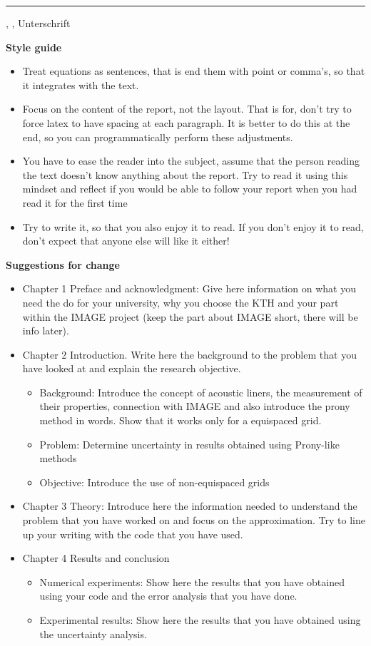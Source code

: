 \documentclass[11pt]{report} %
\begin{document}
\vspace{18.1mm}
\rule[-3.7mm]{\linewidth}{0.5pt}
\Ort{}, \Datum{}, Unterschrift


{\bf Style guide}
\begin{itemize}
\item Treat equations as sentences, that is end them with point or comma's, so that it integrates with the text.
\item Focus on the content of the report, not the layout. That is for, don't try to force latex to have spacing at each paragraph. It is better to do this at the end, so you can programmatically perform these adjustments.
\item You have to ease the reader into the subject, assume that the person reading the text doesn't know anything about the report. Try to read it using this mindset and reflect if you would be able to follow your report when you had read it for the first time
\item Try to write it, so that you also enjoy it to read. If you don't enjoy it to read, don't expect that anyone else will like it either!
\end{itemize}
{\bf Suggestions for change}
\begin{itemize}
    \item Chapter 1 Preface and acknowledgment: Give here information on what you need the do for your university, why you choose the KTH and your part within the IMAGE project (keep the part about IMAGE short, there will be info later).
    \item Chapter 2 Introduction. Write here the background to the problem that you have looked at and explain the research objective.
        \begin{itemize}
            \item Background: Introduce the concept of acoustic liners, the measurement of their properties, connection with IMAGE and also introduce the prony method in words. Show that it works only for a equispaced grid. 
            \item Problem: Determine uncertainty in results obtained using Prony-like methods
            \item Objective: Introduce the use of non-equispaced grids
        \end{itemize}
    \item Chapter 3 Theory: Introduce here the information needed to understand the problem that you have worked on and focus on the approximation. Try to line up your writing with the code that you have used.
    \item Chapter 4 Results and conclusion
        \begin{itemize}
            \item Numerical experiments: Show here the results that you have obtained using your code and the error analysis that you have done.
            \item Experimental results: Show here the results that you have obtained using the uncertainty analysis.
        \end{itemize}
\end{itemize}
\end{document}
